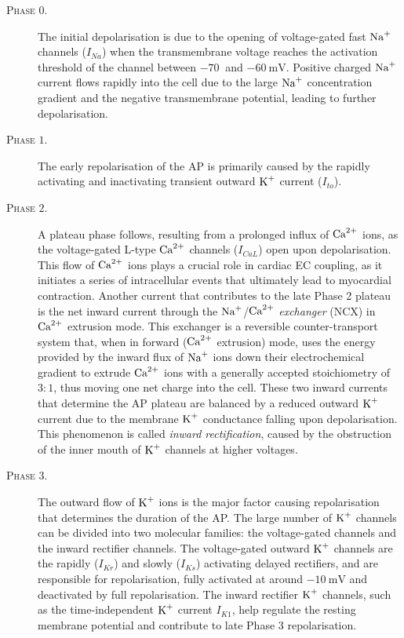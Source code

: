 \begin{description}
	\item[\textsc{Phase $0$.}] The initial depolarisation is due to the opening of voltage-gated fast $\textrm{Na}^{+}$ channels ($I_{Na}$) when the transmembrane voltage reaches the activation threshold of the channel between $\SI{-70}{}$ and $\SI{-60}{\milli\volt}$. Positive charged $\textrm{Na}^{+}$ current flows rapidly into the cell due to the large $\textrm{Na}^{+}$ concentration gradient and the negative transmembrane potential, leading to further depolarisation.
	\item[\textsc{Phase $1$.}] The early repolarisation of the AP is primarily caused by the rapidly activating and inactivating transient outward $\textrm{K}^{+}$ current ($I_{to}$).
	\item[\textsc{Phase $2$.}] A plateau phase follows, resulting from a prolonged influx of $\textrm{Ca}^{2+}$ ions, as the voltage-gated L-type $\textrm{Ca}^{2+}$ channels ($I_{CaL}$) open upon depolarisation. This flow of $\textrm{Ca}^{2+}$ ions plays a crucial role in cardiac EC coupling, as it initiates a series of intracellular events that ultimately lead to myocardial contraction. Another current that contributes to the late Phase 2 plateau is the net inward current through the $\textrm{Na}^{+}$/$\textrm{Ca}^{2+}$ \textit{exchanger} (\acs{NCX}) in $\textrm{Ca}^{2+}$ extrusion mode. This exchanger is a reversible counter-transport system that, when in forward ($\textrm{Ca}^{2+}$ extrusion) mode, uses the energy provided by the inward flux of $\textrm{Na}^{+}$ ions down their electrochemical gradient to extrude $\textrm{Ca}^{2+}$ ions with a generally accepted stoichiometry of $3\colon 1$, thus moving one net charge into the cell. These two inward currents that determine the AP plateau are balanced by a reduced outward $\textrm{K}^{+}$ current due to the membrane $\textrm{K}^{+}$ conductance falling upon depolarisation. This phenomenon is called \textit{inward rectification}, caused by the obstruction of the inner mouth of $\textrm{K}^{+}$ channels at higher voltages.
	\item[\textsc{Phase $3$.}] The outward flow of $\textrm{K}^{+}$ ions is the major factor causing repolarisation that determines the duration of the AP. The large number of $\textrm{K}^{+}$ channels can be divided into two molecular families: the voltage-gated channels and the inward rectifier channels. The voltage-gated outward $\textrm{K}^{+}$ channels are the rapidly ($I_{Kr}$) and slowly ($I_{Ks}$) activating delayed rectifiers, and are responsible for repolarisation, fully activated at around $\SI{-10}{\milli\volt}$ and deactivated by full repolarisation. The inward rectifier $\textrm{K}^{+}$ channels, such as the time-independent $\textrm{K}^{+}$ current $I_{K1}$, help regulate the resting membrane potential and contribute to late Phase $3$ repolarisation.

\end{description}
